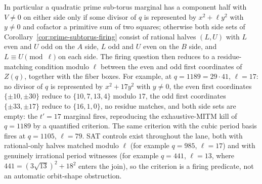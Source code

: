 \documentclass[11pt]{article}
\theoremstyle{plain}
\theoremstyle{definition}
\theoremstyle{remark}
\begin{document}
In particular a quadratic prime sub-torus marginal has a component half with
$V\ne0$ on either side only if some divisor of $q$ is represented by
$x^2+\ell y^2$ with $y\ne0$ and cofactor a primitive sum of two squares;
otherwise both side sets of Corollary~\ref{cor:prime-subtorus-firing} consist
of rational halves $(L,U)$ with $L$ even and $U$ odd on the $A$ side, $L$ odd
and $U$ even on the $B$ side, and $L\equiv U\pmod\ell$ on each side.  The
firing question then reduces to a residue-matching condition modulo $\ell$
between the even and odd first coordinates of $Z(q)$, together with the
fiber boxes.  For example, at $q=1189=29\cdot41$, $\ell=17$: no divisor of
$q$ is represented by $x^2+17y^2$ with $y\ne0$, the even first coordinates
$\{\pm10,\pm30\}$ reduce to $\{10,7,13,4\}$ modulo $17$, the odd first
coordinates $\{\pm33,\pm17\}$ reduce to $\{16,1,0\}$, no residue matches, and
both side sets are empty: the $t'=17$ marginal fires, reproducing the
exhaustive-MITM kill of $q=1189$ by a quantified criterion.  The same
criterion with the cubic period basis fires at $q=1105$, $\ell=79$.  SAT
controls exist throughout the lane, both with rational-only halves matched
modulo $\ell$ (for example $q=985$, $\ell=17$) and with genuinely irrational
period witnesses (for example $q=441$, $\ell=13$, where
$441=(3\sqrt{13})^2+18^2$ enters the join), so the criterion is a firing
predicate, not an automatic orbit-shape obstruction.
\end{document}

